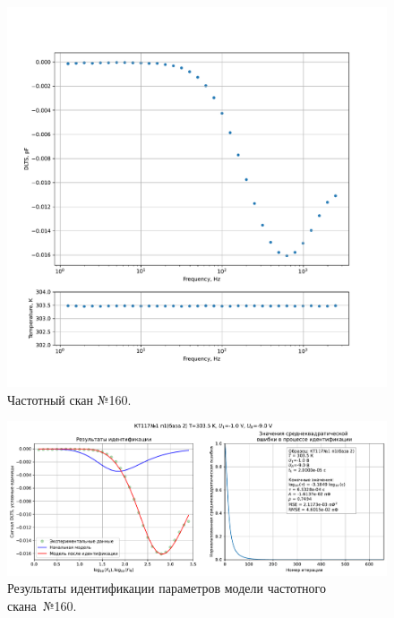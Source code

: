 \begin{figure}[!ht]
    \centering
    \includegraphics[width=1\textwidth]{../plots/КТ117№1_п1(база 2)_2500Гц-1Гц_1пФ_+30С_-1В-9В_200мВ_20мкс_шаг_0,1.pdf}
    \caption{Частотный скан №160.}
    \label{pic:frequency_scan_160}
\end{figure}

\begin{figure}[!ht]
    \centering
    \includegraphics[width=1\textwidth]{../plots/КТ117№1_п1(база 2)_2500Гц-1Гц_1пФ_+30С_-1В-9В_200мВ_20мкс_шаг_0,1_model.pdf}
    \caption{Результаты идентификации параметров модели частотного скана~№160.}
    \label{pic:frequency_scan_model160}
\end{figure}

\pagebreak



